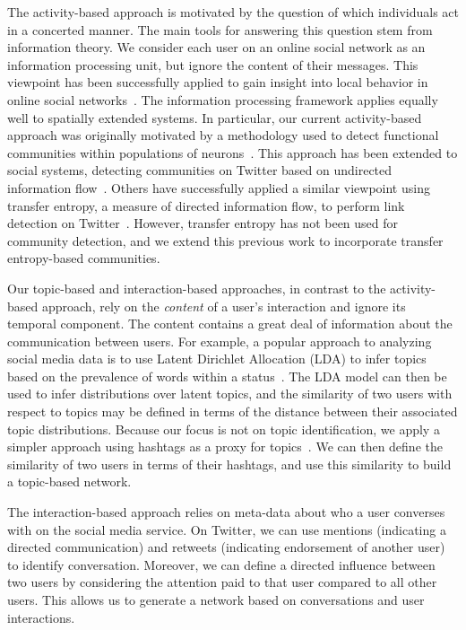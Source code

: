 The activity-based approach is motivated by the question of which individuals act in a concerted manner. The main tools for answering this question stem from information theory. We consider each user on an online social network as an information processing unit, but ignore the content of their messages. This viewpoint has been successfully applied to gain insight into local behavior in online social networks~\cite{darmon2013understanding}. The information processing framework applies equally well to spatially extended systems. In particular, our current activity-based approach was originally motivated by a methodology used to detect functional communities within populations of neurons~\cite{shalizi2007discovering}. This approach has been extended to social systems, detecting communities on Twitter based on undirected information flow~\cite{darmon2013detecting}. Others have successfully applied a similar viewpoint using transfer entropy, a measure of directed information flow, to perform link detection on Twitter~\cite{ver2012information}. However, transfer entropy has not been used for community detection, and we extend this previous work to incorporate transfer entropy-based communities.

Our topic-based and interaction-based approaches, in contrast to the activity-based approach, rely on the \emph{content} of a user's interaction and ignore its temporal component. The content contains a great deal of information about the communication between users. For example, a popular approach to analyzing social media data is to use Latent Dirichlet Allocation (LDA) to infer topics based on the prevalence of words within a status~\cite{zhao2011comparing,michelson2010discovering}. The LDA model can then be used to infer distributions over latent topics, and the similarity of two users with respect to topics may be defined in terms of the distance between their associated topic distributions. Because our focus is not on topic identification, we apply a simpler approach using hashtags as a proxy for topics~\cite{becker2011beyond,tsur2012s}. We can then define the similarity of two users in terms of their hashtags, and use this similarity to build a topic-based network.

The interaction-based approach relies on meta-data about who a user converses with on the social media service. On Twitter, we can use mentions (indicating a directed communication) and retweets (indicating endorsement of another user) to identify conversation. Moreover, we can define a directed influence between two users by considering the attention paid to that user compared to all other users. This allows us to generate a network based on conversations and user interactions.

